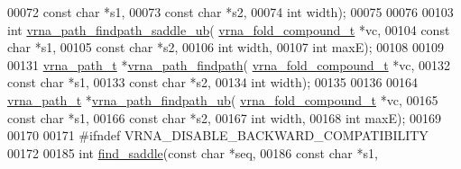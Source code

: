 \begin{DoxyCode}
00072                               \textcolor{keyword}{const} \textcolor{keywordtype}{char}            *s1,
00073                               \textcolor{keyword}{const} \textcolor{keywordtype}{char}            *s2,
00074                               \textcolor{keywordtype}{int}                   width);
00075 
00076 
00103 \textcolor{keywordtype}{int} \mbox{\hyperlink{group__direct__paths_gada8d722e37401b1aea30128b07555771}{vrna\_path\_findpath\_saddle\_ub}}(
      \mbox{\hyperlink{group__fold__compound_structvrna__fc__s}{vrna\_fold\_compound\_t}} *vc,
00104                                  \textcolor{keyword}{const} \textcolor{keywordtype}{char}           *s1,
00105                                  \textcolor{keyword}{const} \textcolor{keywordtype}{char}           *s2,
00106                                  \textcolor{keywordtype}{int}                  width,
00107                                  \textcolor{keywordtype}{int}                  maxE);
00108 
00109 
00131 \mbox{\hyperlink{group__direct__paths_structvrna__path__s}{vrna\_path\_t}} *\mbox{\hyperlink{group__direct__paths_ga4b2283c4142cafd99678495585fcc842}{vrna\_path\_findpath}}(
      \mbox{\hyperlink{group__fold__compound_structvrna__fc__s}{vrna\_fold\_compound\_t}}  *vc,
00132                                 \textcolor{keyword}{const} \textcolor{keywordtype}{char}            *s1,
00133                                 \textcolor{keyword}{const} \textcolor{keywordtype}{char}            *s2,
00134                                 \textcolor{keywordtype}{int}                   width);
00135 
00136 
00164 \mbox{\hyperlink{group__direct__paths_structvrna__path__s}{vrna\_path\_t}} *\mbox{\hyperlink{group__direct__paths_ga8d47812616303f40057dfb033869863a}{vrna\_path\_findpath\_ub}}(
      \mbox{\hyperlink{group__fold__compound_structvrna__fc__s}{vrna\_fold\_compound\_t}} *vc,
00165                                    \textcolor{keyword}{const} \textcolor{keywordtype}{char}           *s1,
00166                                    \textcolor{keyword}{const} \textcolor{keywordtype}{char}           *s2,
00167                                    \textcolor{keywordtype}{int}                  width,
00168                                    \textcolor{keywordtype}{int}                  maxE);
00169 
00170 
00171 \textcolor{preprocessor}{#ifndef VRNA\_DISABLE\_BACKWARD\_COMPATIBILITY}
00172 
00185 \textcolor{keywordtype}{int} \mbox{\hyperlink{group__direct__paths_ga4c0dabf032c04eeab9c7370d15db6ad2}{find\_saddle}}(\textcolor{keyword}{const} \textcolor{keywordtype}{char}  *seq,
00186                 \textcolor{keyword}{const} \textcolor{keywordtype}{char}  *s1,

\end{DoxyCode}
